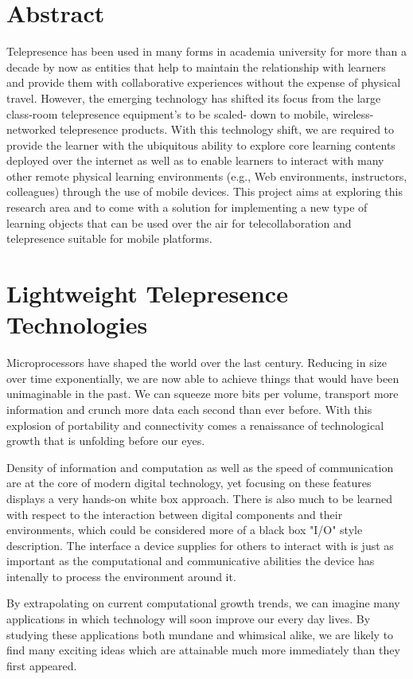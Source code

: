 \documentclass[final,a4paper,12pt]{report}
\begin{document}
\chapter*{\centering Abstract}
Telepresence has been used in many forms in academia university for more than a decade by now as entities that help to maintain the relationship with learners and provide them with collaborative experiences without the expense of physical travel. However, the emerging technology has shifted its focus from the large class-room telepresence equipment’s to be scaled- down to mobile, wireless-networked telepresence products. With this technology shift, we are required to provide the learner with the ubiquitous ability to explore core learning contents deployed over the internet as well as to enable learners to interact with many other remote physical learning environments (e.g., Web environments, instructors, colleagues) through the use of mobile devices. This project aims at exploring this research area and to come with a solution for implementing a new type of learning objects that can be used over the air for telecollaboration and telepresence suitable for mobile platforms. 

\chapter{Lightweight Telepresence Technologies}

Microprocessors have shaped the world over the last century. Reducing in size over time exponentially, we are now able to achieve things that would have been unimaginable in the past. We can squeeze more bits per volume, transport more information and crunch more data each second than ever before. With this explosion of portability and connectivity comes a renaissance of technological growth that is unfolding before our eyes.

Density of information and computation as well as the speed of communication are at the core of modern digital technology, yet focusing on these features displays a very hands-on white box approach. There is also much to be learned with respect to the interaction between digital components and their environments, which could be considered more of a black box "I/O" style description. The interface a device supplies for others to interact with is just as important as the computational and communicative abilities the device has intenally to process the environment around it.

By extrapolating on current computational growth trends, we can imagine many applications in which technology will soon improve our every day lives. By studying these applications both mundane and whimsical alike, we are likely to find many exciting ideas which are attainable much more immediately than they first appeared.
\end{document}
